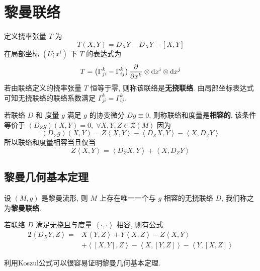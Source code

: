 \section{黎曼联络}
    定义挠率张量 $T$ 为
    \begin{equation*}
        T(X,Y)=D_XY-D_XY-[X,Y]
    \end{equation*}
    在局部坐标 $\left(U;x^i\right)$ 下 $T$ 的表达式为
    \begin{equation*}
        T = \left(\Gamma^{k}_{ji}-\Gamma^{k}_{ij}\right)\frac{\partial }{\partial x^k}\otimes{\rm d} x^i\otimes{\rm d} x^j
    \end{equation*}
    若由联络定义的挠率张量 $T$ 恒等于零, 则称该联络是\textbf{无挠联络}. 由局部坐标表达式可知无挠联络的联络系数满足 $\Gamma^{k}_{ji}=\Gamma^{k}_{ij}$.

    若联络 $D$ 和 度量 $g$ 满足 $g$ 的协变微分 $Dg\equiv0$, 则称联络和度量是\textbf{相容的}. 该条件等价于 $(D_Zg)(X,Y)=0,\;\forall X,Y,Z\in\mathfrak{X}(M)$ 因为
    \begin{equation*}
        (D_Zg)(X,Y) = Z\left\langle X,Y\right\rangle - \left\langle D_ZX,Y\right\rangle - \left\langle X,D_ZY\right\rangle
    \end{equation*}
    所以联络和度量相容当且仅当
    \begin{equation*}
        Z\left\langle X,Y\right\rangle = \left\langle D_ZX,Y\right\rangle + \left\langle X,D_ZY\right\rangle
    \end{equation*}

\subsection{黎曼几何基本定理}
    \begin{theorem}
        设 $(M,g)$ 是黎曼流形, 则 $M$ 上存在唯一一个与 $g$ 相容的无挠联络 $D$, 我们称之为\textbf{黎曼联络}.
    \end{theorem}

    \begin{theorem}[Koszul公式] \label{eq:koszul}
        若联络 $D$ 满足无挠且与度量 $\left\langle \cdot,\cdot\right\rangle$ 相容, 则有公式
        \begin{align}
            2\left\langle D_XY,Z\right\rangle =& X\left\langle Y,Z\right\rangle+ Y\left\langle X,Z\right\rangle -Z\left\langle X,Y\right\rangle \nonumber \\
            & +\left\langle [X,Y],Z\right\rangle -\left\langle X,[Y,Z]\right\rangle -\left\langle Y,[X,Z]\right\rangle
        \end{align}
    \end{theorem}
    利用Koszul公式可以很容易证明黎曼几何基本定理.

